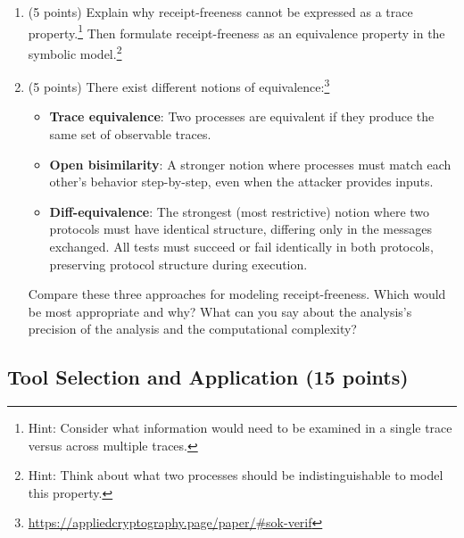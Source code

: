 \documentclass[10pt,a4paper,american]{article}
\begin{document}
\begin{enumerate}
	      \begin{enumerate}
		      \item (5 points) Explain why receipt-freeness cannot be expressed as a trace property.\footnote{Hint: Consider what information would need to be examined in a single trace versus across multiple traces.} Then formulate receipt-freeness as an equivalence property in the symbolic model.\footnote{Hint: Think about what two processes should be indistinguishable to model this property.}
		      \item (5 points) There exist different notions of equivalence:\footnote{\url{https://appliedcryptography.page/paper/\#sok-verif}}
		            \begin{itemize}
			            \item \textbf{Trace equivalence}: Two processes are equivalent if they produce the same set of observable traces.
			            \item \textbf{Open bisimilarity}: A stronger notion where processes must match each other's behavior step-by-step, even when the attacker provides inputs.
			            \item \textbf{Diff-equivalence}: The strongest (most restrictive) notion where two protocols must have identical structure, differing only in the messages exchanged. All tests must succeed or fail identically in both protocols, preserving protocol structure during execution.
		            \end{itemize}
		            Compare these three approaches for modeling receipt-freeness. Which would be most appropriate and why? What can you say about the analysis's precision of the analysis and the computational complexity?
	      \end{enumerate}
\end{enumerate}

\subsection{Tool Selection and Application (15 points)}
\end{document}
